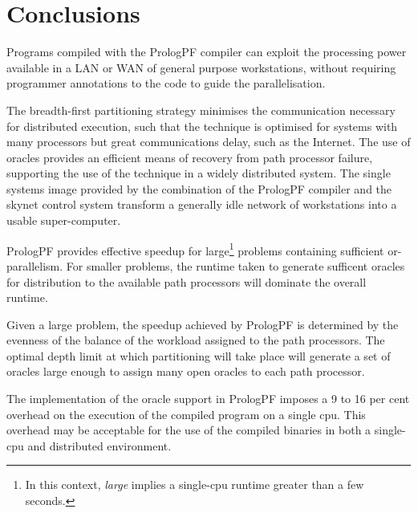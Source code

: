 \chapter{Conclusions}
\label{conclusions}

Programs compiled with the PrologPF compiler can exploit the processing
power available in a LAN or WAN of general purpose workstations, without
requiring programmer annotations to the code to guide the parallelisation.

The breadth-first partitioning strategy minimises the communication
necessary for distributed execution, such that the technique is
optimised for systems with many processors but great communications
delay, such as the Internet.  The use of oracles provides an efficient
means of recovery from path processor failure, supporting the use of
the technique in a widely distributed system.  The single systems
image provided by the combination of the PrologPF compiler and the
skynet control system transform a generally idle network of
workstations into a usable super-computer.

PrologPF provides effective speedup for large\footnote{In this context, \textit{large}
implies a single-cpu runtime greater than a few seconds.}
problems containing sufficient or-parallelism.  For smaller problems, the runtime
taken to generate sufficent oracles for distribution to the available path processors
will dominate the overall runtime.

Given a large problem, the speedup achieved by PrologPF is determined by the
evenness of the balance of the workload assigned to the path processors.  The optimal
depth limit at which partitioning will take place will generate a set of oracles large
enough to assign many open oracles to each path processor.

The implementation of the oracle support in PrologPF imposes a 9 to 16 per cent
overhead on the execution of the compiled program on a single cpu.  This overhead
may be acceptable for the use of the compiled binaries in both a single-cpu and
distributed environment.

